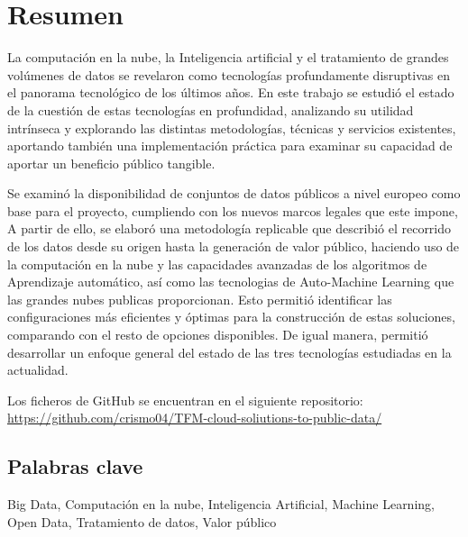 \chapter*{Resumen}

La computación en la nube, la Inteligencia artificial y el tratamiento de grandes volúmenes de datos se revelaron como tecnologías profundamente disruptivas en el panorama tecnológico de los últimos años. En este trabajo se estudió el estado de la cuestión de estas tecnologías en profundidad, analizando su utilidad intrínseca y explorando las distintas metodologías, técnicas y servicios existentes, aportando también una implementación práctica para examinar su capacidad de aportar un beneficio público tangible.

Se examinó la disponibilidad de conjuntos de datos públicos a nivel europeo como base para el proyecto, cumpliendo con los nuevos marcos legales que este impone, A partir de ello, se elaboró una metodología replicable que describió el recorrido de los datos desde su origen hasta la generación de valor público, haciendo uso de la computación en la nube y las capacidades avanzadas de los algoritmos de Aprendizaje automático, así como las tecnologias de Auto-Machine Learning que las grandes nubes publicas proporcionan. Esto permitió identificar las configuraciones más eficientes y óptimas para la construcción de estas soluciones, comparando con el resto de opciones disponibles. De igual manera, permitió desarrollar un enfoque general del estado de las tres tecnologías estudiadas en la actualidad. %

Los ficheros de GitHub se encuentran en el siguiente repositorio:  \url{https://github.com/crismo04/TFM-cloud-soliutions-to-public-data/}
	
\section*{Palabras clave}
   
\noindent Big Data, Computación en la nube, Inteligencia Artificial, Machine Learning, Open Data, Tratamiento de datos, Valor público
   


